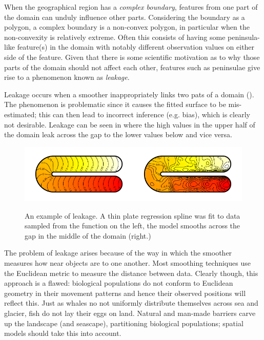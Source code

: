 When the geographical region has a \emph{complex boundary}, features from one part of the domain can unduly influence other parts. Considering the boundary as a polygon, a complex boundary is a non-convex polygon, in particular when the non-convexity is relatively extreme. Often this consists of having some peninsula-like feature(s) in the domain with notably different observation values on either side of the feature. Given that there is some scientific motivation as to why those parts of the domain should not affect each other, features such as peninsulae give rise to a phenomenon known as \emph{leakage}.

Leakage occurs when a smoother inappropriately links two pats of a domain (\cite{soap}). The phenomenon is problematic since it causes the fitted surface to be mis-estimated; this can then lead to incorrect inference (e.g. bias), which is clearly not desirable. Leakage can be seen in  where the high values in the upper half of the domain leak across the gap to the lower values below and vice versa.

\begin{figure}
\centering
\includegraphics{intro/figs/ramsay-leak.pdf}\\
\caption{An example of leakage. A thin plate regression spline was fit to data sampled from the function on the left, the model smooths across the gap in the middle of the domain (right.)}
\label{leakage}
\end{figure}

The problem of leakage arises because of the way in which the smoother measures how near objects are to one another. Most smoothing techniques use the Euclidean metric to measure the distance between data. Clearly though, this approach is a flawed: biological populations do not conform to Euclidean geometry in their movement patterns and hence their observed positions will reflect this. Just as whales no not uniformly distribute themselves across sea and glacier, fish do not lay their eggs on land. Natural and man-made barriers carve up the landscape (and seascape), partitioning biological populations; spatial models should take this into account.

